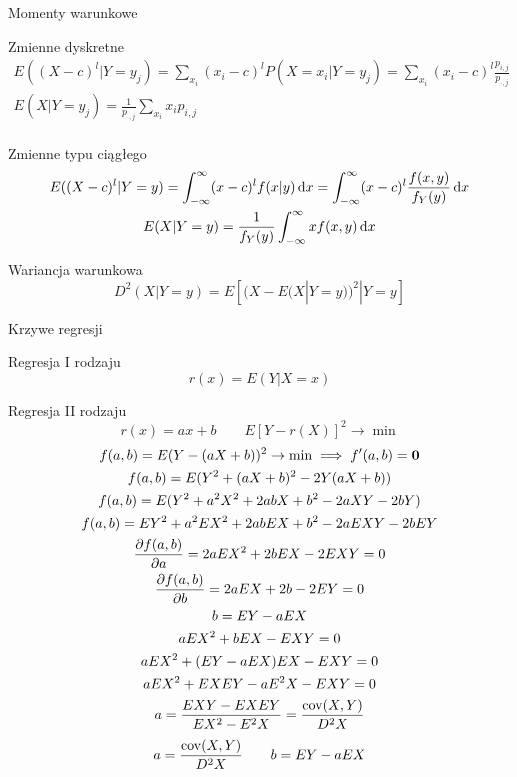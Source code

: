 \documentclass{mp}
\begin{document}
\begin{frame}{Momenty warunkowe}
{
\begin{block}{Zmienne dyskretne}
\begin{gather*}
E((X-c)^l|Y=y_j)=\sum_{x_i} (x_i-c)^lP(X=x_i|Y=y_j)=\sum_{x_i} (x_i-c)^l\frac{p_{i,j}}{p_{\cdot,j}} \\
E(X|Y=y_j)=\frac{1}{p_{\cdot,j}}\sum_{x_i} x_ip_{i,j} \\
\end{gather*}
\end{block}
}
{
\begin{block}{Zmienne typu ciągłego}
\begin{gather*}
E((X-c)^l|Y=y)=\int_{-\infty}^\infty (x-c)^lf(x|y)\,\text{d}x=\int_{-\infty}^\infty (x-c)^l\frac{f(x,y)}{f_Y(y)}\,\text{d}x \\
E(X|Y=y)=\frac{1}{f_Y(y)}\int_{-\infty}^\infty xf(x,y)\,\text{d}x
\end{gather*}
\end{block}
}
{
\begin{block}{Wariancja warunkowa}
\[ D^2(X|Y=y)=E\left[(X-E(X|Y=y))^2|Y=y\right] \]
\end{block}
}
\end{frame}

\begin{frame}{Krzywe regresji}
\begin{block}{Regresja I rodzaju}
\[ r(x)=E(Y|X=x)  \]
\end{block}
\pause
\begin{block}{Regresja II rodzaju}
\[ r(x)=ax+b \qquad E\left[Y-r(X)\right]^2\to\min \]
\note
{
	\begin{gather*}
	f(a,b)=E(Y-(aX+b))^2\to\min \implies f'(a,b)=\bm{0} \\
	f(a,b)=E(Y^2+(aX+b)^2-2Y(aX+b))\\
	f(a,b)=E(Y^2+a^2X^2+2abX+b^2-2aXY-2bY)\\
	f(a,b)=EY^2+a^2EX^2+2abEX+b^2-2aEXY-2bEY \\
	\frac{\partial f(a,b)}{\partial a}=2aEX^2+2bEX-2EXY=0 \\
	\frac{\partial f(a,b)}{\partial b}=2aEX+2b-2EY=0 \\
	b=EY-aEX \\
	aEX^2+bEX-EXY=0 \\
	aEX^2+(EY-aEX)EX-EXY=0 \\
	aEX^2+EXEY-aE^2X-EXY=0 \\
	a=\frac{EXY-EXEY}{EX^2-E^2X}=\frac{\operatorname{cov}(X,Y)}{D^2X} \\
	\end{gather*}
}
\pause
\[ a=\frac{\operatorname{cov}(X,Y)}{D^2X} \qquad b=EY-aEX \]
\end{block}
\end{frame}


\end{document}

